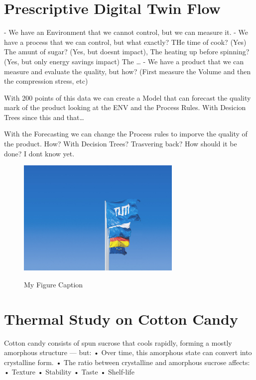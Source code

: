 \section{Prescriptive Digital Twin Flow}

- We have an Environment that we cannot control, but we can measure it.
- We have a process that we can control, but what exactly? THe time of cook? (Yes) The amunt of sugar? (Yes, but doesnt impact), The heating up before spinning? (Yes, but only energy savings impact) The \dots
- We have a product that we can measure and evaluate the quality, but how? (First measure the Volume and then the compression stress, etc) 

With 200 points of this data we can create a Model that can forecast the quality mark of the product looking at the ENV and the Process Rules. With Desicion Trees since this and that\dots

With the Forecasting we can change the Process rules to imporve the quality of the product. How? With Decision Trees? Trasvering back? How should it be done? I dont know yet.


\begin{figure}[h]
    \centering
    \caption{My Figure Caption}
    \includegraphics[width=0.7\textwidth]{tum-resources/images/Universitaet_Flaggen.jpg}
    \label{fig:firstFigure}
\end{figure}




\section{Thermal Study on Cotton Candy}
Cotton candy consists of spun sucrose that cools rapidly, forming a mostly amorphous structure — but:
	•	Over time, this amorphous state can convert into crystalline form.
	•	The ratio between crystalline and amorphous sucrose affects:
	•	Texture
	•	Stability
	•	Taste
	•	Shelf-life

